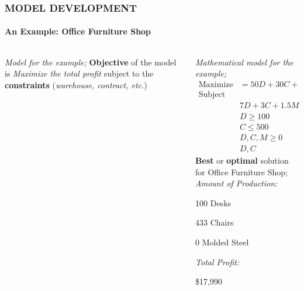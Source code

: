 \documentclass[14 pt]{beamer}
\begin{document}
\begin{frame}[t]
\frametitle{MODEL DEVELOPMENT}
\framesubtitle{An Example: Office Furniture Shop}

\begin{columns}[t]
\begin{column}{0.45\textwidth}
\emph{Model for the example;}
\vskip0.5cm%
\textbf{Objective} of the model is \emph{Maximize the total profit} subject to the \textbf{constraints} (\emph{warehouse, contract, etc.})
\end{column}

\begin{column}{0.45\textwidth}
\emph{Mathematical model for the example;}
\begin{equation*}
\begin{array}{lll}
\text{Maximize Z}  & = 50D + 30C + 6M \\
\text{Subject to:} & & \\
                   & 7D + 3C + 1.5M \leq 2,000 & \text{~warehouse limit for steel} \\
                   & D \geq 100 & \text{~from contract} \\
                   & C \leq 500 & \text{~from contract} \\
                   & D, C, M \geq 0 & \text{~non negativity} \\
                   & D, C & \text{~are integers}
\end{array}
\end{equation*}
\vskip1.5cm%
\textbf{Best} or \textbf{optimal} solution for Office Furniture Shop;
\vskip0.5cm%
\emph{Amount of Production:} \\
\begin{description}
  \item 100 Desks
  \item 433 Chairs
  \item 0 Molded Steel
\end{description}
\emph{Total Profit:} \\
\begin{description}
  \item \$17,990
\end{description}

\end{column}
\end{columns}
\end{frame}

\end{document}
